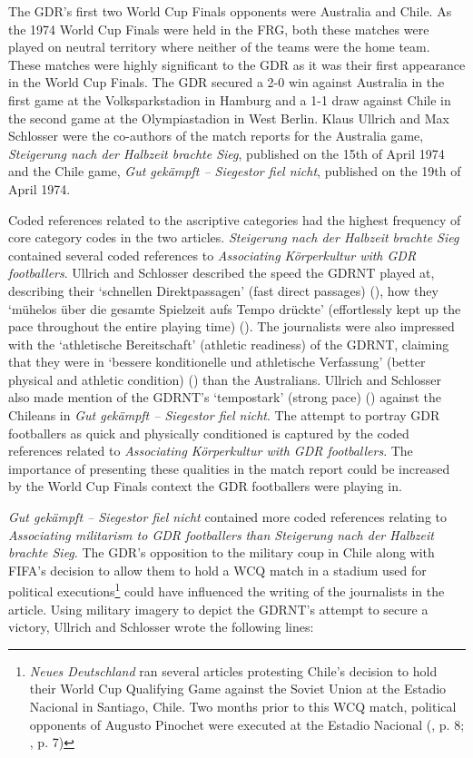 The GDR’s first two World Cup Finals opponents were Australia and Chile. As the 1974 World Cup Finals were held in the FRG, both these matches were played on neutral territory where neither of the teams were the home team. These matches were highly significant to the GDR as it was their first appearance in the World Cup Finals. The GDR secured a 2-0 win against Australia in the first game at the Volksparkstadion in Hamburg and a 1-1 draw against Chile in the second game at the Olympiastadion in West Berlin. Klaus Ullrich and Max Schlosser were the co-authors of the match reports for the Australia game, \textit{Steigerung nach der Halbzeit brachte Sieg}, published on the 15th of April 1974 and the Chile game, \textit{Gut gekämpft – Siegestor fiel nicht}, published on the 19th of April 1974.

Coded references related to the ascriptive categories had the highest frequency of core category codes in the two articles. \textit{Steigerung nach der Halbzeit brachte Sieg} contained several coded references to \textit{Associating Körperkultur with GDR footballers}. Ullrich and Schlosser described the speed the GDRNT played at, describing their ‘schnellen Direktpassagen’ (fast direct passages) (\cite{nd19740615}), how they ‘mühelos über die gesamte Spielzeit aufs Tempo drückte’ (effortlessly kept up the pace throughout the entire playing time) (\cite{nd19740615}). The journalists were also impressed with the ‘athletische Bereitschaft’ (athletic readiness) of the GDRNT, claiming that they were in ‘bessere konditionelle und athletische Verfassung’ (better physical and athletic condition) (\cite{nd19740615}) than the Australians. Ullrich and Schlosser also made mention of the GDRNT’s ‘tempostark’ (strong pace) (\cite{nd19740619}) against the Chileans in \textit{Gut gekämpft – Siegestor fiel nicht}. The attempt to portray GDR footballers as quick and physically conditioned is captured by the coded references related to \textit{Associating Körperkultur with GDR footballers}. The importance of presenting these qualities in the match report could be increased by the World Cup Finals context the GDR footballers were playing in.

\textit{Gut gekämpft – Siegestor fiel nicht} contained more coded references relating to \textit{Associating militarism to GDR footballers} \textit{than Steigerung nach der Halbzeit brachte Sieg}. The GDR’s opposition to the military coup in Chile along with FIFA’s decision to allow them to hold a WCQ match in a stadium used for political executions\footnote{\textit{Neues Deutschland} ran several articles protesting Chile’s decision to hold their World Cup Qualifying Game against the Soviet Union at the Estadio Nacional in Santiago, Chile. Two months prior to this WCQ match, political opponents of Augusto Pinochet were executed at the Estadio Nacional (\cite{nd19731104a}, p. 8; \cite{nd19731112}, p. 7)} could have influenced the writing of the journalists in the article. Using military imagery to depict the GDRNT’s attempt to secure a victory, Ullrich and Schlosser wrote the following lines:

